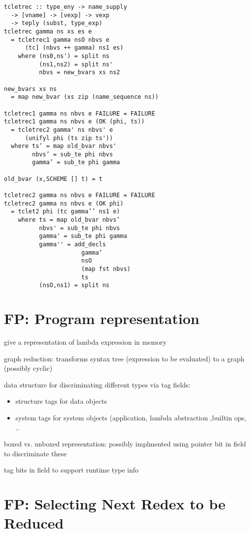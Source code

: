 \documentclass[8pt]{extarticle}
\begin{document}
\begin{multicols*}{2}
\begin{verbatim}
tcletrec :: type_eny -> name_supply
  -> [vname] -> [vexp] -> vexp
  -> teply (subst, type_exp)
tcletrec gamma ns xs es e
  = tcletrec1 gamma nsO nbvs e
      (tc] (nbvs ++ gamma) ns1 es)
    where (ns0,ns') = split ns
          (ns1,ns2) = split ns'
          nbvs = new_bvars xs ns2

new_bvars xs ns 
  = map new_bvar (xs zip (name_sequence ns))

tcletrec1 gamma ns nbvs e FAILURE = FAILURE
tcletrec1 gamma ns nbvs e (OK (phi, ts))
  = tcletrec2 gamma' ns nbvs' e
      (unifyl phi (ts zip ts'))
  where ts’ = map old_bvar nbvs'
        nbvs’ = sub_te phi nbvs
        gamma’ = sub_te phi gamma

old_bvar (x,SCHEME [] t) = t

tcletrec2 gamma ns nbvs e FAILURE = FAILURE
tcletrec2 gamma ns nbvs e (OK phi)
  = tclet2 phi (tc gamma’’ ns1 e)
    where ts = map old_bvar nbvs’
          nbvs' = sub_te phi nbvs
          gamma' = sub_te phi gamma
          gamma'' = add_decls
                      gamma’
                      nsO
                      (map fst nbvs)
                      ts
          (nsO,ns1) = split ns
\end{verbatim}

\vfill\null
\columnbreak

\section{FP: Program representation}

give a representation of lambda expression in memory

graph reduction: transforms syntax tree (expression to be evaluated) to a graph (possibly cyclic)

data structure for discriminating different types via tag fields:
\begin{itemize}
\item structure tags for data objects
\item system tags for system objects (application, lambda abstraction ,builtin ops, ..
\end{itemize}

boxed vs. unboxed representation: possibly implmented using pointer bit in field to discriminate these

tag bits in field to support runtime type info

\vfill\null
\columnbreak

\section{FP: Selecting Next Redex to be Reduced}


\end{multicols*}
\end{document}
